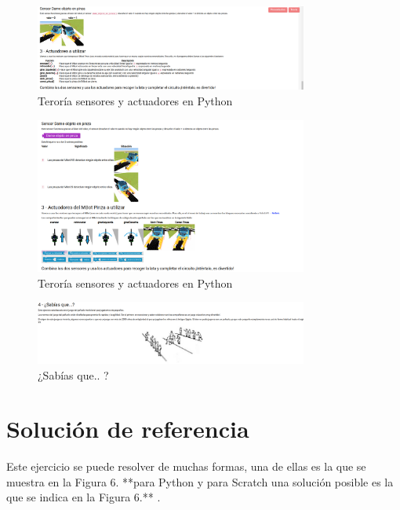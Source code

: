 \begin{figure}[H]
    \centering
    \includegraphics[width=0.8\textwidth, height=0.4\textwidth]{chapters/images/teoriag4python.png}
    \caption{Teroría sensores y actuadores en Python}
    \label{fig:my_label}
\end{figure}
\begin{figure}[H]
    \centering
    \includegraphics[width=0.8\textwidth, height=0.4\textwidth]{chapters/images/teoriag4scratch.png}
    \caption{Teroría sensores y actuadores en Python}
    \label{fig:my_label}
\end{figure}
\begin{figure}[H]
    \centering
    \includegraphics[width=0.8\textwidth, height=0.4\textwidth]{chapters/images/teoriag5.png}
    \caption{¿Sabías que.. ?}
    \label{fig:my_label}
\end{figure}

\section{Solución de referencia}
Este ejercicio se puede resolver de muchas formas, una de ellas es la que se muestra en la Figura 6. **para Python y para Scratch una solución posible es la que se indica en la Figura 6.** . 

